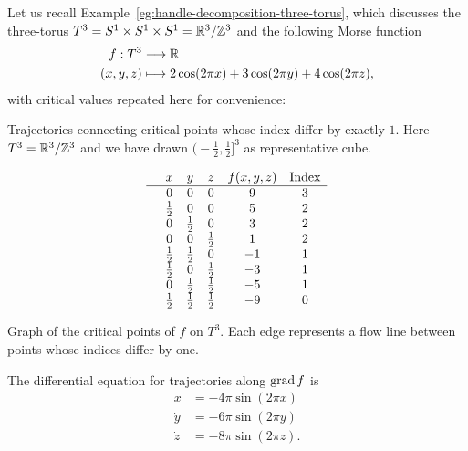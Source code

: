 \begin{eg}
    \label{eg:homology-of-the-three-torus}
    Let us recall Example~\ref{eg:handle-decomposition-three-torus}, which discusses the three-torus $T^{3} = S^{1} \times S^{1} \times S^{1} = \mathbb{R}^3 / \mathbb{Z}^3$ and the following Morse function
    \begin{align*}
        f: T^3 &\longrightarrow \mathbb{R} \\
        (x,y,z) &\longmapsto 2 \cos(2 \pi x)+ 3 \cos(2 \pi y) + 4 \cos (2 \pi z),
    \end{align*}
    with critical values repeated here for convenience:
    \begin{marginfigure}
        \centering
        \caption{
        Trajectories connecting critical points whose index differ by exactly $1$.
        Here $T^{3} = \mathbb{R}^{3} / \mathbb{Z}^{3}$ and we have drawn $\big(-\frac{1}{2}, \frac{1}{2}\big]^3$ as representative cube.  }
        \label{fig:morse-homology-three-torus-trajectories}
    \end{marginfigure}
    \[\begin{array}{cccccc}
  & x & y  & z & f(x, y, z) & \text{Index}\\ \hline
  & 0 & 0 & 0 & 9 & 3 \\
& \frac{1}{2} & 0 & 0 & 5 & 2 \\
& 0 & \frac{1}{2} & 0 & 3 & 2 \\
& 0 & 0 & \frac{1}{2} & 1 & 2 \\
& \frac{1}{2} & \frac{1}{2} & 0 & -1 & 1 \\
& \frac{1}{2} & 0 & \frac{1}{2} & -3 & 1 \\
& 0 & \frac{1}{2} & \frac{1}{2} & -5 & 1 \\
& \frac{1}{2} & \frac{1}{2} & \frac{1}{2} & -9 & 0 \\
    \end{array}\]
    \begin{marginfigure}
        \centering
        \caption{Graph of the critical points of $f$ on $T^{3}$.
            Each edge represents a flow line between points whose indices differ by one.
        }
        \label{fig:mores-homology-three-torus-critical-points-graph}
    \end{marginfigure}
    The differential equation for trajectories along $\operatorname{grad} f$ is 
    \begin{align*}
        \dot x &= -4 \pi \sin(2 \pi x)\\
        \dot y &= -6 \pi \sin(2 \pi y)\\
        \dot z &= -8 \pi \sin(2 \pi z)
    .\end{align*} 



\end{eg}
